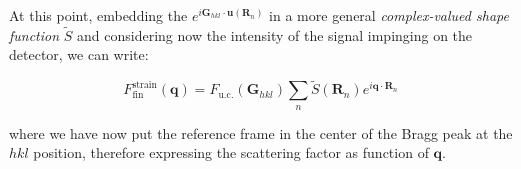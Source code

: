 At this point, embedding the $e^{i \mathbf{G}_{hkl} \cdot  \mathbf{u}(\mathbf{R}_n) }$ in a more general \textit{complex-valued 
shape function} $\tilde{S}$ and considering now the intensity of the signal impinging on the detector, we can write: 

\begin{equation}
    F^{\text{strain}}_{\text{fin}}(\mathbf{q}) = F_{\text{u.c.}}(\mathbf{G}_{hkl}) \sum_{n} \tilde{S}(\mathbf{R}_n) e^{i \mathbf{q} \cdot  \mathbf{R}_n }
    \label{eq:strain_fin4}
\end{equation}

where we have now put the reference frame in the center of the Bragg peak at the $hkl$ position, therefore expressing 
the scattering factor as function of $\mathbf{q}$.






